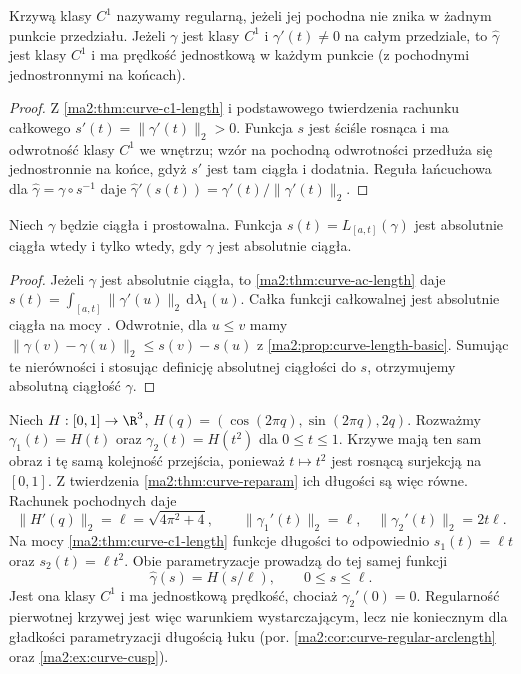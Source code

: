 \begin{wniosek}
\label{ma2:cor:curve-regular-arclength}
Krzywą klasy $C^1$ nazywamy regularną, jeżeli jej
pochodna nie znika w żadnym punkcie przedziału.
Jeżeli $\gamma$ jest klasy $C^1$ i $\gamma'(t)\ne0$
na całym przedziale, to $\widehat\gamma$ jest klasy
$C^1$ i ma prędkość jednostkową w każdym punkcie
(z pochodnymi jednostronnymi na końcach).
\end{wniosek}
\begin{proof}
Z \ref{ma2:thm:curve-c1-length} i podstawowego
twierdzenia rachunku całkowego
$s'(t)=\|\gamma'(t)\|_2>0$. Funkcja $s$ jest
ściśle rosnąca i ma odwrotność klasy $C^1$
we wnętrzu; wzór na pochodną odwrotności
przedłuża się jednostronnie na końce,
gdyż $s'$ jest tam ciągła i dodatnia.
Reguła łańcuchowa dla $\widehat\gamma=\gamma\circ s^{-1}$
daje $\widehat\gamma'(s(t))=\gamma'(t)/\|\gamma'(t)\|_2$.
\end{proof}

\begin{wniosek}
\label{ma2:cor:curve-ac-arclength}
Niech $\gamma$ będzie ciągła i prostowalna.
Funkcja $s(t)=L_{[a,t]}(\gamma)$ jest absolutnie
ciągła wtedy i tylko wtedy, gdy $\gamma$ jest
absolutnie ciągła.
\end{wniosek}
\begin{proof}
Jeżeli $\gamma$ jest absolutnie ciągła, to
\ref{ma2:thm:curve-ac-length} daje
$s(t)=\int_{[a,t]}\|\gamma'(u)\|_2\,\mathrm d\lambda_1(u)$.
Całka funkcji całkowalnej jest absolutnie ciągła
na mocy
.
Odwrotnie, dla $u\le v$ mamy
$\|\gamma(v)-\gamma(u)\|_2\le s(v)-s(u)$
z \ref{ma2:prop:curve-length-basic}.
Sumując te nierówności i stosując definicję
absolutnej ciągłości do $s$, otrzymujemy
absolutną ciągłość $\gamma$.
\end{proof}

\begin{przyklad}
\label{ma2:ex:curve-arclength-variable-speed}
Niech $H:[0,1]\to\R^3$,
$H(q)=(\cos(2\pi q),\sin(2\pi q),2q)$.
Rozważmy $\gamma_1(t)=H(t)$ oraz
$\gamma_2(t)=H(t^2)$ dla $0\le t\le1$.
Krzywe mają ten sam obraz i tę samą
kolejność przejścia, ponieważ
$t\mapsto t^2$ jest rosnącą surjekcją
na $[0,1]$. Z twierdzenia
\ref{ma2:thm:curve-reparam} ich długości
są więc równe.
Rachunek pochodnych daje
\[
 \|H'(q)\|_2=\ell=\sqrt{4\pi^2+4},
 \qquad
 \|\gamma_1'(t)\|_2=\ell,\quad
 \|\gamma_2'(t)\|_2=2t\ell.
\]
Na mocy \ref{ma2:thm:curve-c1-length}
funkcje długości to odpowiednio
$s_1(t)=\ell t$ oraz $s_2(t)=\ell t^2$.
Obie parametryzacje prowadzą do tej
samej funkcji
\[
 \widehat\gamma(s)=H(s/\ell),\qquad 0\le s\le\ell.
\]
Jest ona klasy $C^1$ i ma jednostkową
prędkość, chociaż $\gamma_2'(0)=0$.
Regularność pierwotnej krzywej jest
więc warunkiem wystarczającym, lecz
nie koniecznym dla gładkości parametryzacji
długością łuku (por.
\ref{ma2:cor:curve-regular-arclength} oraz
\ref{ma2:ex:curve-cusp}).
\end{przyklad}


